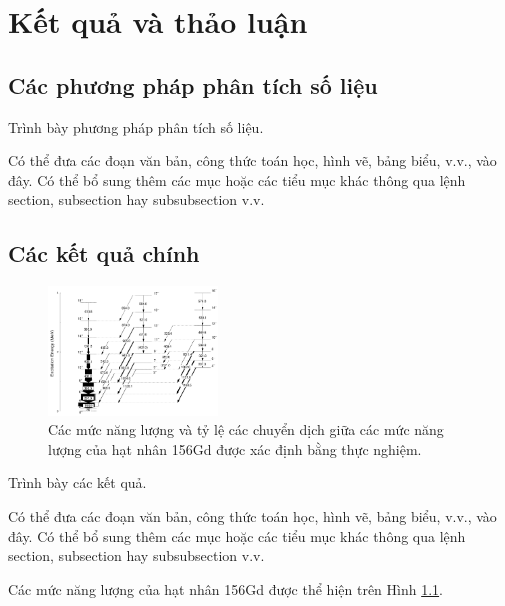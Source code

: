 \chapter{Kết quả và thảo luận}
\label{ch:ketquaphantich}

\section{Các phương pháp phân tích số liệu}

Trình bày phương pháp phân tích số liệu. 

Có thể đưa các đoạn văn bản, công thức toán học, hình vẽ, bảng biểu, v.v., vào đây. Có thể bổ sung thêm các mục hoặc các tiểu mục khác thông qua lệnh section, subsection hay subsubsection v.v.

\section{Các kết quả chính}

\begin{figure}[!htb]
\centering
\includegraphics[width=0.4\textwidth]{figure/fig_ketquaphantich/156Gd.png}
\caption{Các mức năng lượng và tỷ lệ các chuyển dịch giữa các mức năng lượng của hạt nhân 156Gd được xác định bằng thực nghiệm.}
\label{fig:156Gd}
\end{figure} 

Trình bày các kết quả. 

Có thể đưa các đoạn văn bản, công thức toán học, hình vẽ, bảng biểu, v.v., vào đây. Có thể bổ sung thêm các mục hoặc các tiểu mục khác thông qua lệnh section, subsection hay subsubsection v.v.

Các mức năng lượng của hạt nhân 156Gd được thể hiện trên Hình \ref{fig:156Gd}.